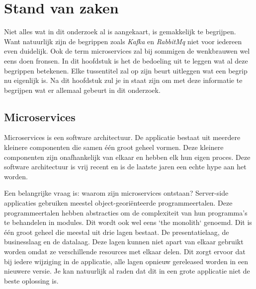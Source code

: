 \chapter{Stand van zaken}
\label{ch:stand-van-zaken}

Niet alles wat in dit onderzoek al is aangekaart, is gemakkelijk te begrijpen. Want natuurlijk zijn de begrippen zoals \emph{Kafka} en \emph{RabbitMq} niet voor iedereen even duidelijk. Ook de term microservices zal bij sommigen de wenkbrauwen wel eens doen fronsen. In dit hoofdstuk is het de bedoeling uit te leggen wat al deze begrippen betekenen. Elke tussentitel zal op zijn beurt uitleggen wat een begrip nu eigenlijk is. Na dit hoofdstuk zul je in staat zijn om met deze informatie te begrijpen wat er allemaal gebeurt in dit onderzoek.
\section{Microservices}

Microservices is een software architectuur. De applicatie bestaat uit meerdere kleinere componenten die samen één groot geheel vormen. Deze kleinere componenten zijn onafhankelijk van elkaar en hebben elk hun eigen proces. Deze software architectuur is vrij recent en is de laatste jaren een echte hype aan het worden.

Een belangrijke vraag is: waarom zijn microservices ontstaan? Server-side applicaties gebruiken meestel object-georiënteerde programmeertalen. Deze programmeertalen hebben abstracties om de complexiteit van hun programma's te behandelen in modules. Dit wordt ook wel eens `the monolith` genoemd. Dit is één groot geheel die meestal uit drie lagen bestaat. De presentatielaag, de businesslaag en de datalaag. Deze lagen kunnen niet apart van elkaar gebruikt worden omdat ze verschillende resources met elkaar delen. Dit zorgt ervoor dat bij iedere wijziging in de applicatie, alle lagen opnieuw gereleased worden in een nieuwere versie. Je kan natuurlijk al raden dat dit in een grote applicatie niet de beste oplossing is. 

